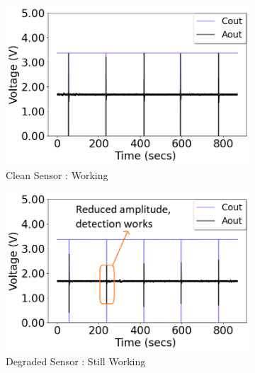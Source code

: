 \begin{figure}[htbp]
	\centering
	\begin{subfigure}[t]{0.23\textwidth}
		\centering
		\includegraphics[width=\textwidth]{figures/gradual_degradation_dust/Stage0.png}
		\caption{Clean Sensor : Working}
		\label{fig:pir_sensor_classIII_fault_good}
	\end{subfigure}
	\hspace{1ex}
	\begin{subfigure}[t]{0.23\textwidth}
		\centering
		\includegraphics[width=\textwidth]{figures/gradual_degradation_dust/Stage1.png}
		\caption{Degraded Sensor : Still Working}
		\label{fig:pir_sensor_classIII_fault_bad1}
	\end{subfigure}	
	\hspace{1ex}
	\begin{subfigure}[t]{0.23\textwidth}

\end{subfigure}
\end{figure}
